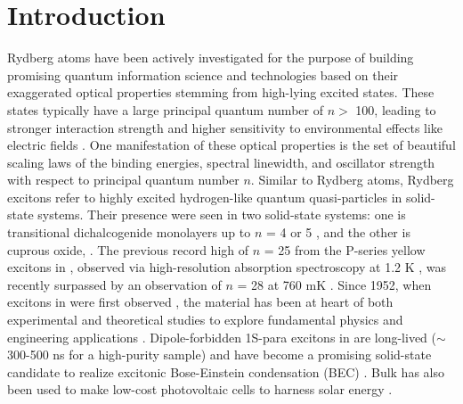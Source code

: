 \documentclass[aps,reprint,amsmath,amssymb,prb]{revtex4-1}
\begin{document}
\section{Introduction}

Rydberg atoms have been actively investigated for the purpose of building promising quantum information science and technologies based on their exaggerated optical properties stemming from high-lying excited states. These states typically have a large principal quantum number of $n >$ 100, leading to stronger interaction strength and higher sensitivity to environmental effects like electric fields \cite{Saffman2010, Adams2019}. One manifestation of these optical properties is the set of beautiful scaling laws of the binding energies, spectral linewidth, and oscillator strength with respect to principal quantum number $n$.
Similar to Rydberg atoms, Rydberg excitons refer to highly excited hydrogen-like quantum quasi-particles in solid-state systems. Their presence were seen in two solid-state systems: one is transitional dichalcogenide monolayers up to $n$ = 4 or 5 \cite{Chernikov2014,Stier2018}, and the other is cuprous oxide, . The previous record high of $n$ = 25 from the P-series yellow excitons in {}, observed via high-resolution absorption spectroscopy at 1.2 K {\cite{Kazimierczuk2014}}, was recently surpassed by an observation of $n$ = 28 at 760 mK {\cite{Heckotter2020_2}}.
Since 1952, when excitons in  were first observed \cite{Hayashi1952a,Hayashi1952b}, the material has been at heart of both experimental and theoretical studies to explore fundamental physics and engineering applications \cite{Itoh1975,Elliott1957,Kubouchi2005, Yoshioka_2012,Snoke2014, Forman1971,Olbrychski1975,Eng_Ito1998,solar_Malerba2011}. Dipole-forbidden 1S-para excitons in  are long-lived ($\sim$ 300-500 ns for a high-purity sample) and have become a promising solid-state candidate to realize excitonic Bose-Einstein condensation (BEC) \cite{Snoke2014}. Bulk  has also been used to make low-cost photovoltaic cells to harness solar energy \cite{Abdu2009,solar_Malerba2011}.
\end{document}
